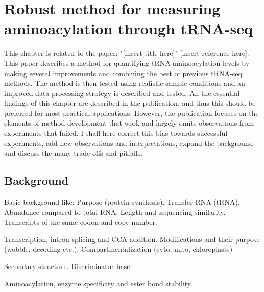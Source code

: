 \chapter{Robust method for measuring aminoacylation through tRNA-seq}
This chapter is related to the paper: "[insert title here]" [insert reference here].
This paper describes a method for quantifying tRNA aminoacylation levels by making several improvements and combining the best of previous tRNA-seq methods.
The method is then tested using realistic sample conditions and an improved data processing strategy is described and tested.
All the essential findings of this chapter are described in the publication, and thus this should be preferred for most practical applications.
However, the publication focuses on the elements of method development that work and largely omits observations from experiments that failed.
I shall here correct this bias towards successful experiments, add new observations and interpretations, expand the background and discuss the many trade offs and pitfalls.


\section{Background}
Basic background like:
Purpose (protein synthesis).
Transfer RNA (tRNA).
Abundance compared to total RNA.
Length and sequencing similarity.
Transcripts of the same codon and copy number.

Transcription, intron splicing and CCA addition.
Modifications and their purpose (wobble, decoding etc.).
Compartmentalization (cyto, mito, chloroplasts)

Secondary structure.
Discriminator base.

Aminoacylation, enzyme specificity and ester bond stability.



